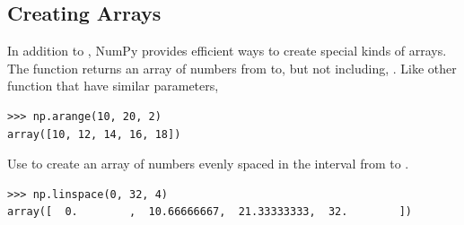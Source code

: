 \subsection*{Creating Arrays}
In addition to , NumPy provides efficient ways to create special kinds of arrays. The function  returns an array of numbers from  to, but not including, . Like other function that have similar parameters,  

\begin{lstlisting}
>>> np.arange(10, 20, 2) 
array([10, 12, 14, 16, 18])
\end{lstlisting}
 
Use  to create an array of  numbers evenly spaced in the interval from  to .
\begin{lstlisting}
>>> np.linspace(0, 32, 4) 
array([  0.        ,  10.66666667,  21.33333333,  32.        ])
\end{lstlisting} 

